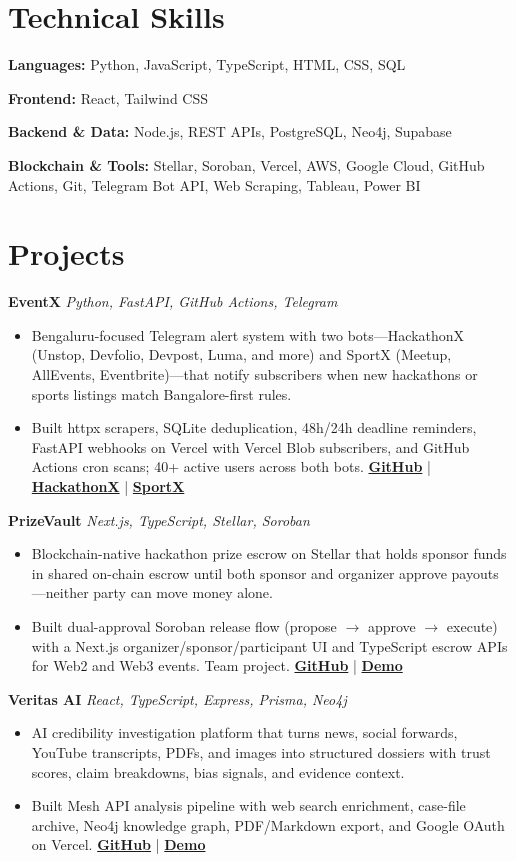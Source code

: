 \documentclass[9pt,letterpaper]{article}
\newcommand{\resumeProject}[2]{%
  \vspace{1pt}%
  \textbf{#1} \hfill {\color{muted}\small\textit{#2}}\par\vspace{1pt}%
}
\newcommand{\resumeItem}{\item}
\newcommand{\skillLine}[2]{%
  \textbf{#1} #2\par\vspace{1pt}%
}
\newcommand{\resumelink}[2]{\href{#1}{\textbf{#2}}}
\begin{document}
\section{Technical Skills}
\vspace{1pt}
\skillLine{Languages:}{Python, JavaScript, TypeScript, HTML, CSS, SQL}
\skillLine{Frontend:}{React, Tailwind CSS}
\skillLine{Backend \& Data:}{Node.js, REST APIs, PostgreSQL, Neo4j, Supabase}
\skillLine{Blockchain \& Tools:}{Stellar, Soroban, Vercel, AWS, Google Cloud, GitHub Actions, Git, Telegram Bot API, Web Scraping, Tableau, Power BI}

\section{Projects}

\resumeProject{EventX}{Python, FastAPI, GitHub Actions, Telegram}
\begin{itemize}[leftmargin=*, nosep, topsep=1pt, itemsep=0pt]
  \resumeItem{Bengaluru-focused Telegram alert system with two bots---HackathonX (Unstop, Devfolio, Devpost, Luma, and more) and SportX (Meetup, AllEvents, Eventbrite)---that notify subscribers when new hackathons or sports listings match Bangalore-first rules.}
  \resumeItem{Built httpx scrapers, SQLite deduplication, 48h/24h deadline reminders, FastAPI webhooks on Vercel with Vercel Blob subscribers, and GitHub Actions cron scans; 40+ active users across both bots. \resumelink{https://github.com/Shashank-V-A/EventX}{GitHub} | \resumelink{https://t.me/EventXva05Bot}{HackathonX} | \resumelink{https://t.me/Sportx_va_bot}{SportX}}
\end{itemize}

\resumeProject{PrizeVault}{Next.js, TypeScript, Stellar, Soroban}
\begin{itemize}[leftmargin=*, nosep, topsep=1pt, itemsep=0pt]
  \resumeItem{Blockchain-native hackathon prize escrow on Stellar that holds sponsor funds in shared on-chain escrow until both sponsor and organizer approve payouts---neither party can move money alone.}
  \resumeItem{Built dual-approval Soroban release flow (propose $\rightarrow$ approve $\rightarrow$ execute) with a Next.js organizer/sponsor/participant UI and TypeScript escrow APIs for Web2 and Web3 events. Team project. \resumelink{https://github.com/karthik1codes/prizevault}{GitHub} | \resumelink{https://prizevault.vercel.app/}{Demo}}
\end{itemize}

\resumeProject{Veritas AI}{React, TypeScript, Express, Prisma, Neo4j}
\begin{itemize}[leftmargin=*, nosep, topsep=1pt, itemsep=0pt]
  \resumeItem{AI credibility investigation platform that turns news, social forwards, YouTube transcripts, PDFs, and images into structured dossiers with trust scores, claim breakdowns, bias signals, and evidence context.}
  \resumeItem{Built Mesh API analysis pipeline with web search enrichment, case-file archive, Neo4j knowledge graph, PDF/Markdown export, and Google OAuth on Vercel. \resumelink{https://github.com/Shashank-V-A/Veritas-AI}{GitHub} | \resumelink{https://veritas-ai-shashank.vercel.app/}{Demo}}
\end{itemize}
\end{document}
